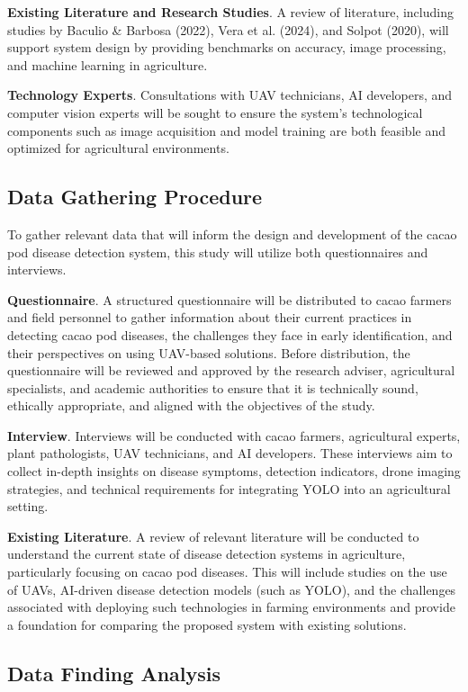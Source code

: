 \textbf{Existing Literature and Research Studies}. A review of literature, including studies by Baculio \& Barbosa (2022), Vera et al. (2024), and Solpot (2020), will support system design by providing benchmarks on accuracy, image processing, and machine learning in agriculture.

\textbf{Technology Experts}. Consultations with UAV technicians, AI developers, and computer vision experts will be sought to ensure the system’s technological components such as image acquisition and model training are both feasible and optimized for agricultural environments.

\subsection*{Data Gathering Procedure}

To gather relevant data that will inform the design and development of the cacao pod disease detection system, this study will utilize both questionnaires and interviews.

\textbf{Questionnaire}. A structured questionnaire will be distributed to cacao farmers and field personnel to gather information about their current practices in detecting cacao pod diseases, the challenges they face in early identification, and their perspectives on using UAV-based solutions. Before distribution, the questionnaire will be reviewed and approved by the research adviser, agricultural specialists, and academic authorities to ensure that it is technically sound, ethically appropriate, and aligned with the objectives of the study.

\textbf{Interview}. Interviews will be conducted with cacao farmers, agricultural experts, plant pathologists, UAV technicians, and AI developers. These interviews aim to collect in-depth insights on disease symptoms, detection indicators, drone imaging strategies, and technical requirements for integrating YOLO into an agricultural setting.

\textbf{Existing Literature}. A review of relevant literature will be conducted to understand the current state of disease detection systems in agriculture, particularly focusing on cacao pod diseases. This will include studies on the use of UAVs, AI-driven disease detection models (such as YOLO), and the challenges associated with deploying such technologies in farming environments and provide a foundation for comparing the proposed system with existing solutions.

\subsection*{Data Finding Analysis}

